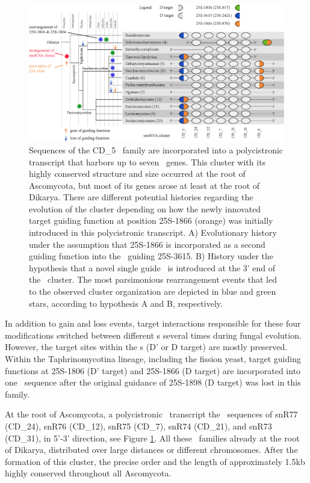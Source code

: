 \begin{figure}
  \centering
  \includegraphics[width=\textwidth]{pics/target_switches_CD_5_cluster.eps}
  \caption[Evolution of a \sno\ cluster harboring CD\_5
  sequences.]{Sequences of the CD\_5 \sno\ family are incorporated into a
    polycistronic transcript that harbors up to seven \sno\ genes. This
    cluster with its highly conserved structure and size occurred at the
    root of Ascomycota, but most of its genes arose at least at the root of
    Dikarya. There are different potential histories regarding the
    evolution of the cluster depending on how the newly innovated target
    guiding function at position 25S-1866 (orange) was initially introduced
    in this polycistronic transcript. A) Evolutionary history under the
    assumption that 25S-1866 is incorporated as a second guiding function
    into the \sno\ guiding 25S-3615. B) History under the hypothesis that a
    novel single guide \sno\ is introduced at the 3' end of the \sno\
    cluster. The most parsimonious rearrangement events that led to the
    observed cluster organization are depicted in blue and green stars,
    according to hypothesis A and B, respectively.}
\label{fig:CD_5_cluster_history}
\end{figure}

In addition to gain and loss events, target interactions responsible for
these four modifications switched between different \sno s several times
during fungal evolution. However, the target sites within the \sno s (D' or
D target) are mostly preserved. Within the Taphrinomycotina lineage,
including the fission yeast, target guiding functions at 25S-1806 (D'
target) and 25S-1866 (D target) are incorporated into one \sno\ sequence
after the original guidance of 25S-1898 (D target) was lost in this family.

At the root of Ascomycota, a polycistronic \sno\ transcript 
the \sno\ sequences of snR77 (CD\_24), snR76 (CD\_12), snR75 (CD\_7), snR74
(CD\_21), and snR73 (CD\_31), \PFS{ordered} in 5'-3' direction, see Figure
\ref{fig:CD_5_cluster_history}.  All these \sno\ families \PFS{have been
  present} already at the root of Dikarya, distributed over large distances
or \PFS{over} different chromosomes. After the formation of this cluster,
the precise order and the length of approximately 1.5kb \PFS{remained}
highly conserved throughout all Ascomycota.

